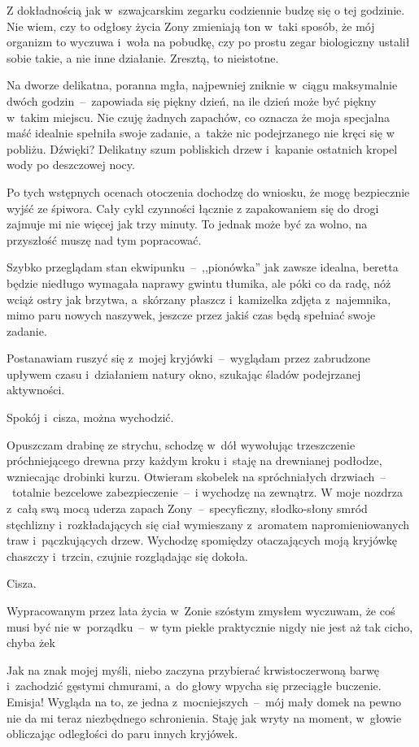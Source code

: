 \documentclass[../MAIN.tex]{subfiles}
\begin{document}
%
%
Z dokładnością jak w~szwajcarskim zegarku codziennie budzę się
o tej godzinie. Nie wiem, czy to odgłosy życia Zony zmieniają
ton w~taki sposób, że mój organizm to wyczuwa i~woła na
pobudkę, czy po prostu zegar biologiczny ustalił sobie takie, a
nie inne działanie. Zresztą, to nieistotne.

Na dworze delikatna, poranna mgła, najpewniej zniknie w~ciągu
maksymalnie dwóch godzin~--~zapowiada się piękny dzień, na ile
dzień może być piękny w~takim miejscu. Nie czuję żadnych
zapachów, co oznacza że moja specjalna maść idealnie spełniła
swoje zadanie, a~także nic podejrzanego nie kręci się w
pobliżu. Dźwięki? Delikatny szum pobliskich drzew i~kapanie
ostatnich kropel wody po deszczowej nocy.

Po tych wstępnych ocenach otoczenia dochodzę do wniosku, że
mogę bezpiecznie wyjść ze śpiwora. Cały cykl czynności łącznie
z zapakowaniem się do drogi zajmuje mi nie więcej jak trzy
minuty. To jednak może być za wolno, na przyszłość muszę nad
tym popracować.

Szybko przeglądam stan ekwipunku~--~,,pionówka'' jak zawsze
idealna, beretta będzie niedługo wymagała naprawy gwintu
tłumika, ale póki co da radę, nóż wciąż ostry jak brzytwa,
a~skórzany płaszcz i~kamizelka zdjęta z~najemnika, mimo paru
nowych naszywek, jeszcze przez jakiś czas będą spełniać swoje
zadanie.

Postanawiam ruszyć się z~mojej kryjówki~--~wyglądam przez
zabrudzone upływem czasu i~działaniem natury okno, szukając
śladów podejrzanej aktywności.

Spokój i~cisza, można wychodzić.

Opuszczam drabinę ze strychu, schodzę w~dół wywołując
trzeszczenie próchniejącego drewna przy każdym kroku i~staję na
drewnianej podłodze, wzniecając drobinki kurzu. Otwieram
skobelek na spróchniałych drzwiach~--~totalnie bezcelowe
zabezpieczenie~--~i wychodzę na zewnątrz. W moje nozdrza z~całą
swą mocą uderza zapach Zony~--~specyficzny, słodko-słony smród
stęchlizny i~rozkładających się ciał wymieszany z~aromatem
napromieniowanych traw i~pączkujących drzew. Wychodzę spomiędzy
otaczających moją kryjówkę chaszczy i~trzcin, czujnie
rozglądając się dokoła.

Cisza.

Wypracowanym przez lata życia w~Zonie szóstym zmysłem wyczuwam,
że coś musi być nie w~porządku~--~w tym piekle praktycznie
nigdy
nie jest aż tak cicho, chyba że\3k

Jak na znak mojej myśli, niebo zaczyna przybierać
krwistoczerwoną barwę i~zachodzić gęstymi chmurami, a~do głowy
wpycha się przeciągłe buczenie. Emisja! Wygląda na to, ze jedna
z~mocniejszych~--~mój mały domek na pewno nie da mi teraz
niezbędnego schronienia. Staję jak wryty na moment, w~głowie
obliczając odległości do paru innych kryjówek.
\end{document}
